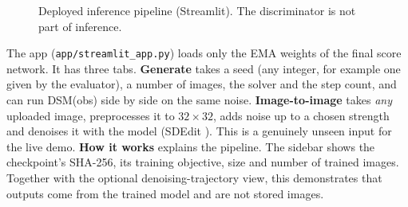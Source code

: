 \documentclass[10pt,a4paper]{article}
\makeatletter
\renewcommand\subsection{\@startsection{subsection}{2}{\z@}{0.9ex \@plus .2ex \@minus .1ex}{0.3ex \@plus .1ex}{\normalfont\normalsize\bfseries\color{Blue}}}
\makeatother
\begin{document}
\subsection{Inference pipeline}
\begin{figure}[H]
\centering
{}
\caption{Deployed inference pipeline (Streamlit). The discriminator is not part of inference.}
\label{fig:pipeline}
\end{figure}
The app (\texttt{app/streamlit\_app.py}) loads only the EMA weights of the final score network. It has three tabs. \textbf{Generate} takes a seed (any integer, for example one given by the evaluator), a number of images, the solver and the step count, and can run DSM(obs) side by side on the same noise. \textbf{Image-to-image} takes \emph{any} uploaded image, preprocesses it to $32\times32$, adds noise up to a chosen strength and denoises it with the model (SDEdit \cite{meng2022sdedit}). This is a genuinely unseen input for the live demo. \textbf{How it works} explains the pipeline. The sidebar shows the checkpoint's SHA-256, its training objective, size and number of trained images. Together with the optional denoising-trajectory view, this demonstrates that outputs come from the trained model and are not stored images.
\end{document}
